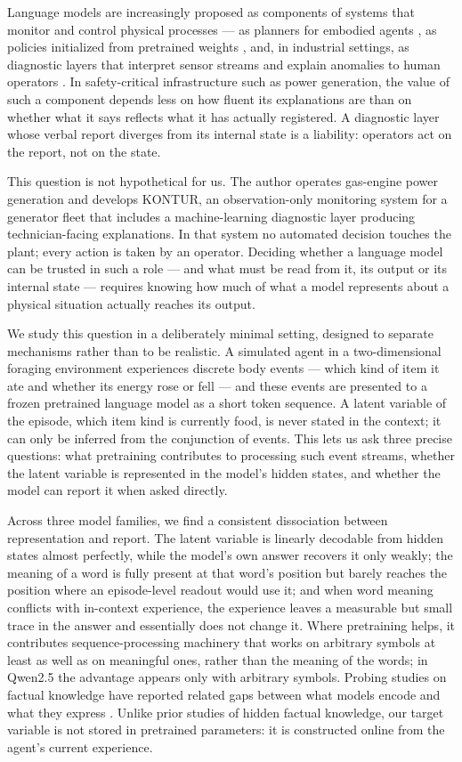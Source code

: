 \documentclass[11pt]{article}
\begin{document}
Language models are increasingly proposed as components of systems that monitor and control physical processes --- as planners for embodied agents \citep{ahn2022,huang2022}, as policies initialized from pretrained weights \citep{li2022,reid2022}, and, in industrial settings, as diagnostic layers that interpret sensor streams and explain anomalies to human operators \citep{dave2024,li2026,liu2025}. In safety-critical infrastructure such as power generation, the value of such a component depends less on how fluent its explanations are than on whether what it says reflects what it has actually registered. A diagnostic layer whose verbal report diverges from its internal state is a liability: operators act on the report, not on the state.

This question is not hypothetical for us. The author operates gas-engine power generation and develops KONTUR, an observation-only monitoring system for a generator fleet that includes a machine-learning diagnostic layer producing technician-facing explanations. In that system no automated decision touches the plant; every action is taken by an operator. Deciding whether a language model can be trusted in such a role --- and what must be read from it, its output or its internal state --- requires knowing how much of what a model represents about a physical situation actually reaches its output.

We study this question in a deliberately minimal setting, designed to separate mechanisms rather than to be realistic. A simulated agent in a two-dimensional foraging environment experiences discrete body events --- which kind of item it ate and whether its energy rose or fell --- and these events are presented to a frozen pretrained language model as a short token sequence. A latent variable of the episode, which item kind is currently food, is never stated in the context; it can only be inferred from the conjunction of events. This lets us ask three precise questions: what pretraining contributes to processing such event streams, whether the latent variable is represented in the model's hidden states, and whether the model can report it when asked directly.

Across three model families, we find a consistent dissociation between representation and report. The latent variable is linearly decodable from hidden states almost perfectly, while the model's own answer recovers it only weakly; the meaning of a word is fully present at that word's position but barely reaches the position where an episode-level readout would use it; and when word meaning conflicts with in-context experience, the experience leaves a measurable but small trace in the answer and essentially does not change it. Where pretraining helps, it contributes sequence-processing machinery that works on arbitrary symbols at least as well as on meaningful ones, rather than the meaning of the words; in Qwen2.5 the advantage appears only with arbitrary symbols. Probing studies on factual knowledge have reported related gaps between what models encode and what they express \citep{orgad2024,gekhman2025,burns2022,azaria2023}. Unlike prior studies of hidden factual knowledge, our target variable is not stored in pretrained parameters: it is constructed online from the agent's current experience.
\end{document}
